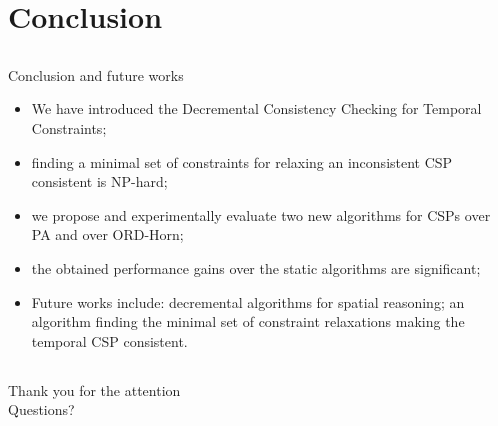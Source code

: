 \section{Conclusion}

\subsection{}
\begin{frame}{Conclusion and future works}
	\begin{itemize}
		\item We have introduced the Decremental Consistency Checking for Temporal Constraints;
		\item finding a minimal set of constraints for relaxing an inconsistent CSP consistent is NP-hard;
		\item we propose and experimentally evaluate two new algorithms for CSPs over PA and over ORD-Horn; 
		\item the obtained performance gains over the static algorithms are significant;
		\item Future works include: decremental algorithms for spatial reasoning; an algorithm finding the minimal set of constraint relaxations making the temporal CSP consistent.
	\end{itemize}
\end{frame}

\subsection{}
\begin{frame}[noframenumbering]{}
	\begin{center}
		\Huge Thank you for the attention \\
		Questions?
	\end{center}
\end{frame}
